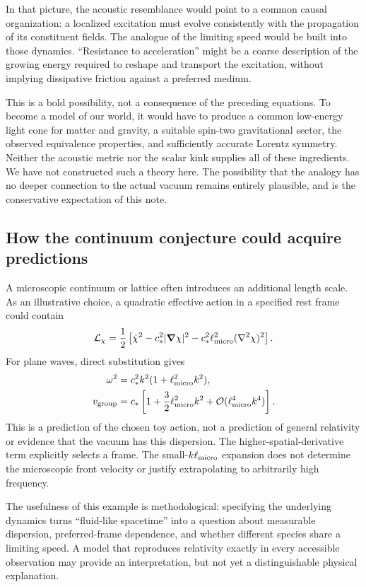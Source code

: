 \documentclass[11pt,a4paper]{article}
\numberwithin{equation}{section}
\newcommand{\Ord}{\mathcal{O}}
\begin{document}
In that picture, the acoustic resemblance would point to a common causal organization: a localized excitation must evolve consistently with the propagation of its constituent fields. The analogue of the limiting speed would be built into those dynamics. ``Resistance to acceleration'' might be a coarse description of the growing energy required to reshape and transport the excitation, without implying dissipative friction against a preferred medium.

This is a bold possibility, not a consequence of the preceding equations. To become a model of our world, it would have to produce a common low-energy light cone for matter and gravity, a suitable spin-two gravitational sector, the observed equivalence properties, and sufficiently accurate Lorentz symmetry. Neither the acoustic metric nor the scalar kink supplies all of these ingredients. We have not constructed such a theory here. The possibility that the analogy has no deeper connection to the actual vacuum remains entirely plausible, and is the conservative expectation of this note.

\subsection{How the continuum conjecture could acquire predictions}

A microscopic continuum or lattice often introduces an additional length scale. As an illustrative choice, a quadratic effective action in a specified rest frame could contain
\begin{equation}
 \mathcal L_\chi=\frac12\left[
 \dot\chi^2-c_*^2|\bm\nabla\chi|^2
 -c_*^2\ell_{\rm micro}^2(\nabla^2\chi)^2\right].
 \label{eq:dispersion-action}
\end{equation}
For plane waves, direct substitution gives
\begin{align}
 \omega^2&=c_*^2k^2(1+\ell_{\rm micro}^2k^2),\\
 v_{\rm group}&=c_*\left[1+
 \frac32\ell_{\rm micro}^2k^2+
 \Ord(\ell_{\rm micro}^4k^4)\right].
 \label{eq:dispersion}
\end{align}
This is a prediction of the chosen toy action, not a prediction of general relativity or evidence that the vacuum has this dispersion. The higher-spatial-derivative term explicitly selects a frame. The small-$k\ell_{\rm micro}$ expansion does not determine the microscopic front velocity or justify extrapolating to arbitrarily high frequency.

The usefulness of this example is methodological: specifying the underlying dynamics turns ``fluid-like spacetime'' into a question about measurable dispersion, preferred-frame dependence, and whether different species share a limiting speed. A model that reproduces relativity exactly in every accessible observation may provide an interpretation, but not yet a distinguishable physical explanation.
\end{document}
